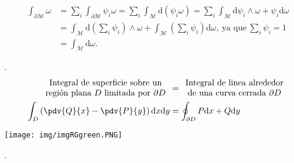 \documentclass[../main]{subfiles}
\begin{document}
\begin{adjustwidth}{0pt}{-100pt}
\begin{enumerate}[itemindent=1cm]
    \begin{equation}
        \begin{split}
            \int_{\partial\mathcal{M}}\omega&= \sum_i \int_{\partial \mathcal{M}} \psi_i \omega=\sum_i \int_{\mathcal{M}} \mathrm{d}(\psi_i \omega)=\sum_i \int_{\mathcal{M}} \mathrm{d}\psi_i \wedge \omega+\psi_i \mathrm{d}\omega \\
            &=\int_{\mathcal{M}} \mathrm{d}\left(\sum_i \psi_i\right) \wedge \omega+ \int_{\mathcal{M}} \left(\sum_i \psi_i\right)\mathrm{d}\omega,\ \text{ya que} \ \sum_i \psi_i=1\\
            &=\int_{\mathcal{M}} \mathrm{d}\omega.
        \end{split}
    \end{equation}
\end{enumerate}

\teorema{\textcolor{red}{Teorema de Green}}. 
\begin{equation}
    \begin{split}
        \begin{array}{c}
            \text{Integral de superficie sobre un} \\
            \text{región plana}\ D \ \text{limitada por}\ \partial D
        \end{array}
        &=
        \begin{array}{c}
            \text{Integral de linea alrededor} \\
            \text{de una curva cerrada} \ \partial D
        \end{array} 
        \\
        \int_D \left(\pdv{Q}{x}-\pdv{P}{y}\right)\mathrm{d}x\mathrm{d}y&=\oint_{\partial D}P\mathrm{d}x+Q\mathrm{d}y   
    \end{split}
\end{equation}

\begin{center}
    \texttt{[image: img/imgRGgreen.PNG]}
\end{center}

\teorema{\textcolor{red}{Formula de Stokes}}.


\end{adjustwidth}
\end{document}
